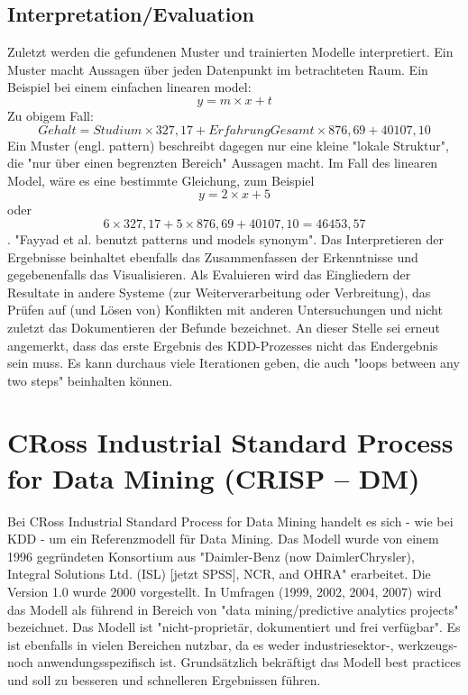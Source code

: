 \subsection{Interpretation/Evaluation}
Zuletzt werden die gefundenen Muster und trainierten Modelle interpretiert. Ein Muster macht Aussagen über jeden Datenpunkt im betrachteten Raum. Ein Beispiel bei einem einfachen linearen \gls{model}: $$y = m \times x + t$$
Zu obigem Fall: $$Gehalt = Studium \times 327,17 + ErfahrungGesamt \times 876,69 + 40107,10$$ Ein Muster (engl. pattern) beschreibt dagegen nur eine kleine "lokale Struktur", die "nur über einen begrenzten Bereich" Aussagen macht.\citep[S.~71; eigene Übersetzung]{swamynathan_mastering_2017} Im Fall des linearen Model, wäre es eine bestimmte Gleichung, zum Beispiel $$y = 2 \times x + 5$$ oder $$ 6 \times 327,17 + 5 \times 876,69 + 40107,10 =  46453,57$$\citep{kraker_towards_2013}. "Fayyad et al. benutzt patterns und models synonym".\citep{kraker_towards_2013}\newline
Das Interpretieren der Ergebnisse beinhaltet ebenfalls das Zusammenfassen der Erkenntnisse und gegebenenfalls das Visualisieren.\citep[S.~71]{swamynathan_mastering_2017} Als Evaluieren wird das Eingliedern der Resultate in andere Systeme (zur Weiterverarbeitung oder Verbreitung), das Prüfen auf (und Lösen von) Konflikten mit anderen Untersuchungen und nicht zuletzt das Dokumentieren der Befunde bezeichnet.\citep[S.~42]{fayyad_data_1996} \newline
An dieser Stelle sei erneut angemerkt, dass das erste Ergebnis des KDD-Prozesses nicht das Endergebnis sein muss. Es kann durchaus viele Iterationen geben, die auch "loops between any two steps" beinhalten können.\citep[S.~42]{fayyad_data_1996}

\section{CRoss Industrial Standard Process for Data Mining (CRISP – DM)}\label{sec:crispdm}
Bei CRoss Industrial Standard Process for Data Mining handelt es sich - wie bei KDD - um ein Referenzmodell für Data Mining. Das Modell wurde von einem 1996 gegründeten Konsortium aus "Daimler-Benz (now DaimlerChrysler), Integral Solutions Ltd. (ISL) [jetzt SPSS], NCR, and OHRA"\citep[S.~13]{shearer_crisp-dm_2000} erarbeitet. Die Version 1.0 wurde 2000 vorgestellt.\citep[S.~13]{shearer_crisp-dm_2000} In Umfragen (1999, 2002, 2004, 2007) wird das Modell als führend in Bereich von "data mining/predictive analytics projects"\citep[S.~72]{swamynathan_mastering_2017} bezeichnet. Das Modell ist "nicht-proprietär, dokumentiert und frei verfügbar"\citep[S.~13; eigene Übersetzung]{shearer_crisp-dm_2000}. Es ist ebenfalls in vielen Bereichen nutzbar, da es weder industriesektor-, werkzeugs- noch anwendungsspezifisch ist. Grundsätzlich bekräftigt das Modell best practices und soll zu besseren und schnelleren Ergebnissen führen.\citep[S.~13; eigene Übersetzung]{shearer_crisp-dm_2000} 

